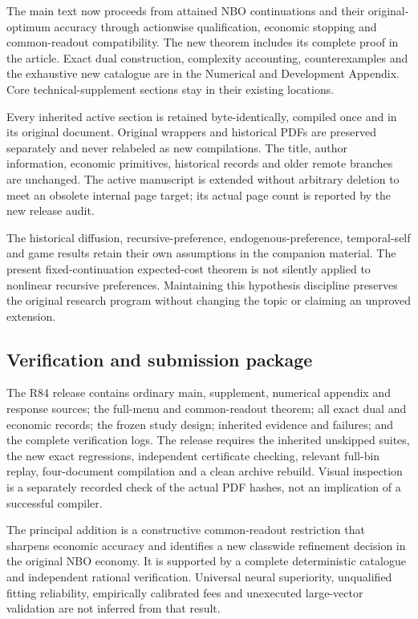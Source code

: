 \documentclass[ecta,nameyear,draft]{econsocart}
\begin{document}
The main text now proceeds from attained NBO continuations and their
original-optimum accuracy through actionwise qualification, economic
stopping and common-readout compatibility. The new theorem includes its
complete proof in the article. Exact dual construction, complexity
accounting, counterexamples and the exhaustive new catalogue are in the
Numerical and Development Appendix. Core technical-supplement sections
stay in their existing locations.

Every inherited active section is retained byte-identically, compiled
once and in its original document. Original wrappers and historical PDFs
are preserved separately and never relabeled as new compilations. The
title, author information, economic primitives, historical records and
older remote branches are unchanged. The active manuscript is extended
without arbitrary deletion to meet an obsolete internal page target; its
actual page count is reported by the new release audit.

The historical diffusion, recursive-preference, endogenous-preference,
temporal-self and game results retain their own assumptions in the
companion material. The present fixed-continuation expected-cost theorem
is not silently applied to nonlinear recursive preferences. Maintaining
this hypothesis discipline preserves the original research program
without changing the topic or claiming an unproved extension.

\hypertarget{verification-and-submission-package}{%
\subsection{Verification and submission
package}\label{verification-and-submission-package}}

The R84 release contains ordinary main, supplement, numerical appendix
and response sources; the full-menu and common-readout theorem; all
exact dual and economic records; the frozen study design; inherited
evidence and failures; and the complete verification logs. The release
requires the inherited unskipped suites, the new exact regressions,
independent certificate checking, relevant full-bin replay,
four-document compilation and a clean archive rebuild. Visual inspection
is a separately recorded check of the actual PDF hashes, not an
implication of a successful compiler.

The principal addition is a constructive common-readout restriction that
sharpens economic accuracy and identifies a new classwide refinement
decision in the original NBO economy. It is supported by a complete
deterministic catalogue and independent rational verification. Universal
neural superiority, unqualified fitting reliability, empirically
calibrated fees and unexecuted large-vector validation are not inferred
from that result.
\end{document}
